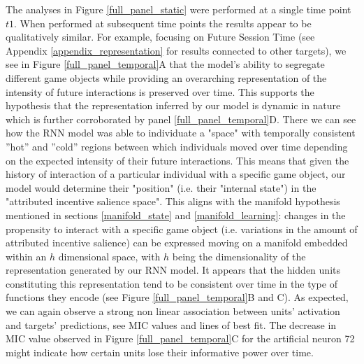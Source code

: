 The analyses in Figure \ref{full_panel_static} were performed at a single time point $t1$. When performed at subsequent time points the results appear to be qualitatively similar. For example, focusing on Future Session Time (see Appendix \ref{appendix_representation} for results connected to other targets), we see in Figure \ref{full_panel_temporal}A that the model's ability to segregate different game objects while providing an  overarching representation of the intensity of future interactions is preserved over time. This supports the hypothesis that the representation inferred by our model is dynamic in nature which is further corroborated by panel \ref{full_panel_temporal}D. There we can see how the RNN model was able to individuate a "space" with temporally consistent ”hot” and ”cold” regions between which individuals moved over time depending on the expected intensity of their future interactions. This means that given the history of interaction of a particular individual with a specific game object, our model would determine their "position" (i.e. their "internal state") in the "attributed incentive salience space". This aligns with the manifold hypothesis mentioned in sections \ref{manifold_state} and \ref{manifold_learning}: changes in the propensity to interact with a specific game object (i.e. variations in the amount of attributed incentive salience) can be expressed moving on a manifold embedded within an $h$ dimensional space, with $h$ being the dimensionality of the representation generated by our RNN model. It appears that the hidden units constituting this representation tend to be consistent over time in the type of functions they encode (see Figure \ref{full_panel_temporal}B and C). As expected, we can again observe a strong non linear association between units' activation and targets' predictions, see MIC values and lines of best fit. The decrease in MIC value observed in Figure \ref{full_panel_temporal}C for the artificial neuron 72 might indicate how certain units lose their informative power over time.
